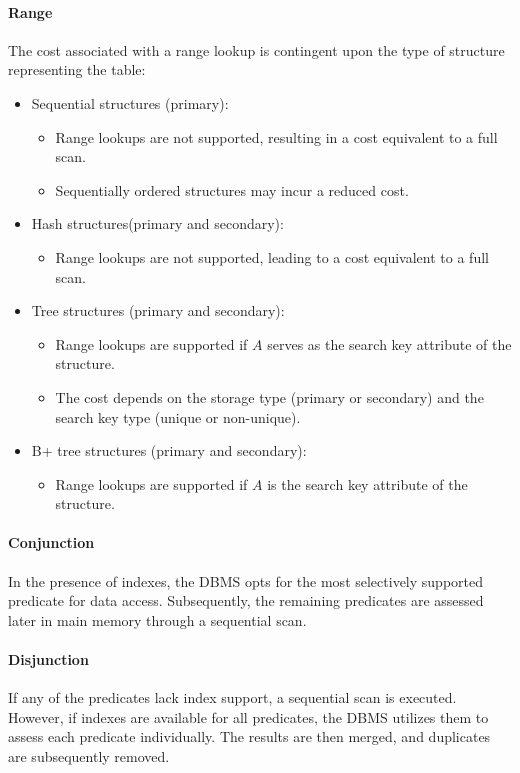\paragraph*{Range}
The cost associated with a range lookup is contingent upon the type of structure representing the table:
\begin{itemize}
    \item Sequential structures (primary):
        \begin{itemize}
            \item Range lookups are not supported, resulting in a cost equivalent to a full scan.
            \item Sequentially ordered structures may incur a reduced cost.
        \end{itemize}
    \item Hash structures(primary and secondary):
        \begin{itemize}
            \item Range lookups are not supported, leading to a cost equivalent to a full scan.
        \end{itemize}
    \item Tree structures (primary and secondary):
        \begin{itemize}
            \item Range lookups are supported if $A$ serves as the search key attribute of the structure.
            \item The cost depends on the storage type (primary or secondary) and the search key type (unique or non-unique).
        \end{itemize}
    \item B+ tree structures (primary and secondary):
        \begin{itemize}
            \item Range lookups are supported if $A$ is the search key attribute of the structure.
        \end{itemize}
\end{itemize}

\paragraph*{Conjunction}
In the presence of indexes, the DBMS opts for the most selectively supported predicate for data access. 
Subsequently, the remaining predicates are assessed later in main memory through a sequential scan.

\paragraph*{Disjunction}
If any of the predicates lack index support, a sequential scan is executed. 
However, if indexes are available for all predicates, the DBMS utilizes them to assess each predicate individually. 
The results are then merged, and duplicates are subsequently removed.

